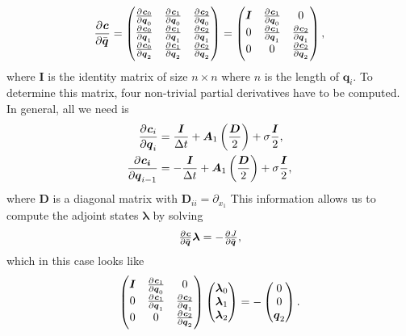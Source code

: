 \documentclass[a4paper]{article}
\renewcommand{\vec}{\boldsymbol}
\begin{document}
\begin{equation}
  \dpd{\vec{c}}{\Bar{\vec{q}}}
  =
  \begin{pmatrix}
    \pd{\vec{c}_{0}}{\vec{q}_{0}}
    & \pd{\vec{c}_{1}}{\vec{q}_{0}}
    & \pd{\vec{c}_{2}}{\vec{q}_{0}}
    \\
    \pd{\vec{c}_{0}}{\vec{q}_{1}}
    & \pd{\vec{c}_{1}}{\vec{q}_{1}}
    & \pd{\vec{c}_{2}}{\vec{q}_{1}}
    \\
    \pd{\vec{c}_{0}}{\vec{q}_{2}}
    & \pd{\vec{c}_{1}}{\vec{q}_{2}}
    & \pd{\vec{c}_{2}}{\vec{q}_{2}}
  \end{pmatrix}
  =
  \begin{pmatrix}
    \vec{I} & \pd{\vec{c}_{1}}{\vec{q}_{0}} & 0
    \\
    0 & \pd{\vec{c}_{1}}{\vec{q}_{1}} & \pd{\vec{c}_{2}}{\vec{q}_{1}}
    \\
    0 & 0 & \pd{\vec{c}_{2}}{\vec{q}_{2}}
  \end{pmatrix},
\end{equation}
where $\vec{I}$ is the identity matrix of size $n\times n$ where
$n$ is the length of $\vec{q}_i$. To determine this matrix, four
non-trivial partial derivatives have to be computed. In general, all
we need is
\begin{equation}
  \begin{aligned}
    \dpd{\vec{c}_{i}}{\vec{q}_{i}}
    &= \frac{\vec{I}}{\Delta t}
    + \vec{A}_{1} \del{\frac{\vec{D}}{2}}
    + \sigma \frac{\vec{I}}{2},
    \\
    \dpd{\vec{c_i}}{\vec{q}_{i-1}}
    &= -\frac{\vec{I}}{\Delta t}
    + \vec{A}_{1} \del{\frac{\vec{D}}{2}}
    + \sigma \frac{\vec{I}}{2},
  \end{aligned}
\end{equation}
where $\vec{D}$ is a diagonal matrix with $\vec{D}_{ii} = \partial_{x_{1}}$
This information allows us to compute the adjoint states
$\vec{\lambda}$ by solving
\begin{equation}
  \pd{\vec{c}}{\Bar{\vec{q}}} \vec{\lambda} = -\pd{J}{\Bar{\vec{q}}},
\end{equation}
which in this case looks like
\begin{equation}
  \begin{pmatrix}
    \vec{I} & \pd{\vec{c}_{1}}{\vec{q}_{0}} & 0
    \\
    0 & \pd{\vec{c}_{1}}{\vec{q}_{1}} & \pd{\vec{c}_{2}}{\vec{q}_{1}}
    \\
    0 & 0 & \pd{\vec{c}_{2}}{\vec{q}_{2}}
  \end{pmatrix}
\begin{pmatrix}
    \vec{\lambda}_{0} \\ \vec{\lambda}_{1} \\ \vec{\lambda}_{2}
  \end{pmatrix}
  =-
  \begin{pmatrix}
    0 \\ 0 \\ \vec{q}_{2}
  \end{pmatrix}.
\end{equation}
\end{document}
